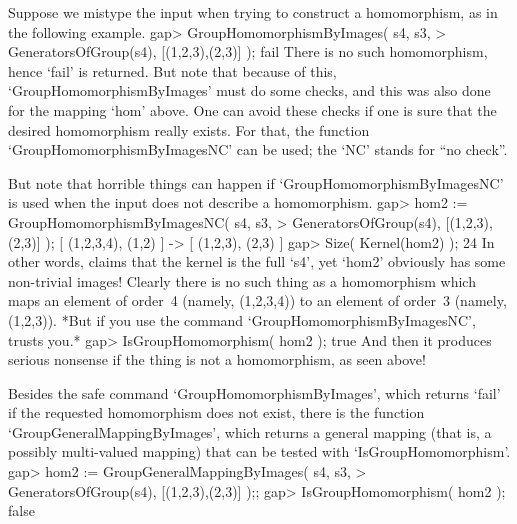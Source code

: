 Suppose we mistype the input when trying to construct a homomorphism,
as in the following example.
\beginexample
gap> GroupHomomorphismByImages( s4, s3,
>        GeneratorsOfGroup(s4), [(1,2,3),(2,3)] );
fail
\endexample
There is no such homomorphism, hence `fail' is returned.
But note that because of this, `GroupHomomorphismByImages' must do
some checks, and this was also done for the mapping `hom' above.
One can avoid these checks if one is sure that the desired
homomorphism really exists.
For that, the function `GroupHomomorphismByImagesNC' can be used;
the `NC' stands for ``no check''.

But note that horrible things can happen if `GroupHomomorphismByImagesNC'
is used when the input does not describe a homomorphism.
\beginexample
gap> hom2 := GroupHomomorphismByImagesNC( s4, s3,
>            GeneratorsOfGroup(s4), [(1,2,3),(2,3)] );
[ (1,2,3,4), (1,2) ] -> [ (1,2,3), (2,3) ]
gap> Size( Kernel(hom2) );
24
\endexample
In other words, {\GAP} claims that the kernel is the full `s4',
yet `hom2' obviously has some non-trivial images!
Clearly there is no such thing as a homomorphism
which maps an element of order~4 (namely, (1,2,3,4))
to an element of order~3 (namely, (1,2,3)).
*But if you use the command `GroupHomomorphismByImagesNC',
{\GAP} trusts you.*
\beginexample
gap> IsGroupHomomorphism( hom2 );
true
\endexample
And then it produces serious nonsense if the thing is not a homomorphism,
as seen above!

Besides the safe command `GroupHomomorphismByImages',
which returns `fail' if the requested homomorphism does not exist,
there is the function `GroupGeneralMappingByImages',
which returns a general mapping (that is, a possibly multi-valued
mapping) that can be tested with `IsGroupHomomorphism'.
\beginexample
gap> hom2 := GroupGeneralMappingByImages( s4, s3,
>            GeneratorsOfGroup(s4), [(1,2,3),(2,3)] );;
gap> IsGroupHomomorphism( hom2 );
false
\endexample

